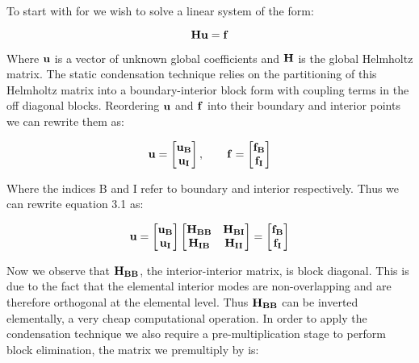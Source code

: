 To start with for we wish to solve a linear system of the form:

\begin{equation}
\bf{Hu} = \bf{f}
\end{equation}

Where \(\bf{u}\) is a vector of unknown global coefficients and \(\bf{H}\) is the global Helmholtz matrix. The static condensation technique relies on the partitioning of this Helmholtz matrix into a boundary-interior block form with coupling terms in the off diagonal blocks. Reordering \(\bf{u}\) and \(\bf{f}\) into their boundary and interior points we can rewrite them as:

\begin{equation}
{\bf{u}} = 
\begin{bmatrix}
{\bf{u_B}} \\
{\bf{u_I}}
  \end{bmatrix}
,
\qquad
{\bf{f}} = 
\begin{bmatrix}
{\bf{f_B}} \\
{\bf{f_I}}
  \end{bmatrix}
\end{equation}

Where the indices B and I refer to boundary and interior respectively. Thus we can rewrite equation 3.1 as:

\begin{equation}
{\bf{u}} = 
\begin{bmatrix}
{\bf{u_B}} \\
{\bf{u_I}}
  \end{bmatrix}
\begin{bmatrix}
{\bf{H_{BB}}} &  {\bf{H_{BI}}}\\
{\bf{H_{IB}}} &  {\bf{H_{II}}} 
  \end{bmatrix}
=
\begin{bmatrix}
{\bf{f_B}} \\
{\bf{f_I}}
  \end{bmatrix}
\end{equation}

Now we observe that \({\bf{H_{BB}}}\), the interior-interior matrix, is block diagonal. This is due to the fact that the elemental interior modes are non-overlapping and are therefore orthogonal at the elemental level. Thus \({\bf{H_{BB}}}\) can be inverted elementally, a very cheap computational operation. In order to apply the condensation technique we also require a pre-multiplication stage to perform block elimination, the matrix we premultiply by is:

